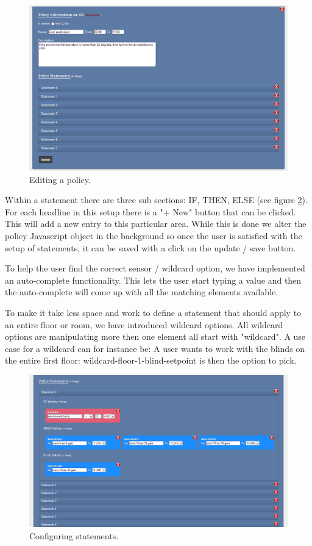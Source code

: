 \begin{figure}[ht]
\centering
\includegraphics[width=\columnwidth]{policy.png}
\caption{Editing a policy.}
\label{fig:policy}
\end{figure}

Within a statement there are three sub sections: IF, THEN, ELSE (see figure \ref{fig:statement}). For each headline in this setup there is a "+ New" button that can be clicked. This will add a new entry to this particular area. While this is done we alter the policy Javascript object in the background so once the user is satisfied with the setup of statements, it can be saved with a click on the update / save button.

To help the user find the correct sensor / wildcard option, we have implemented an auto-complete functionality. This lets the user start typing a value and then the auto-complete will come up with all the matching elements available.

To make it take less space and work to define a statement that should apply to an entire floor or room, we have introduced wildcard options. All wildcard options are manipulating more then one element all start with "wildcard". A use case for a wildcard can for instance be: A user wants to work with the blinds on the entire first floor: wildcard-floor-1-blind-setpoint is then the option to pick.

\begin{figure}[ht]
\centering
\includegraphics[width=\columnwidth]{statement.png}
\caption{Configuring statements.}
\label{fig:statement}
\end{figure}

